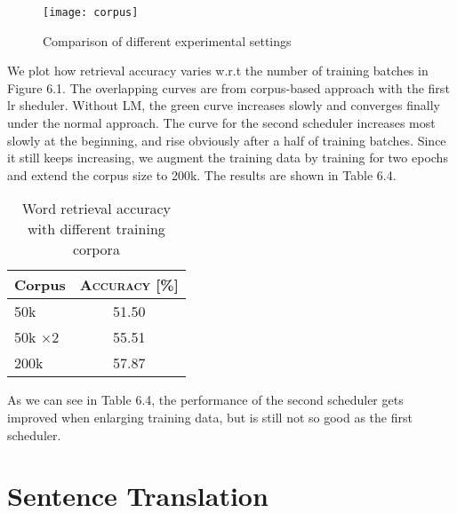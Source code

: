 \begin{figure}[h]
	\texttt{[image: corpus]}
	\centering
	\caption{Comparison of different experimental settings}
\end{figure}
We plot how retrieval accuracy varies w.r.t the number of training batches in Figure 6.1. The overlapping curves are from corpus-based approach with the first lr sheduler.  Without LM, the green curve increases slowly and converges finally under the normal approach. The curve for the second scheduler increases most slowly at the beginning, and rise obviously after a half of training batches. Since it still keeps increasing, we augment the training data by training for two epochs and extend the corpus size to 200k. The results are shown in Table 6.4.\\

\begin{table}[h]
	\centering
	\begin{tabular}{lc}
		\hline
		Corpus & \textsc{Accuracy} [\%] \\ \hline
		50k    & 51.50         \\ \hline
		50k $\times$2  & 55.51         \\ \hline
		200k   & 57.87         \\ \hline
	\end{tabular}
	\caption{Word retrieval accuracy with different training corpora}
\end{table}
As we can see in Table 6.4, the performance of the second scheduler gets improved when enlarging training data, but is still not so good as the first scheduler.  


\section{Sentence Translation}


